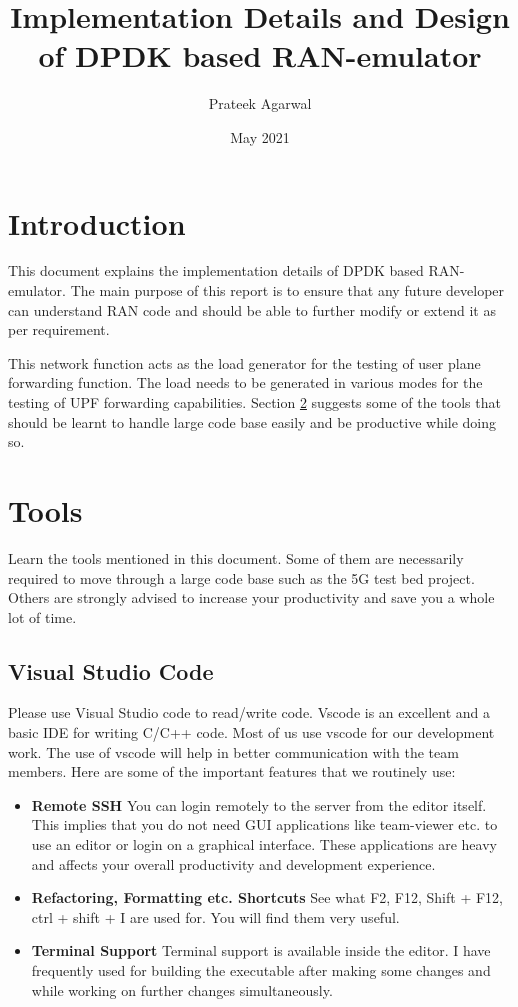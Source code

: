 \documentclass{article}
\title{Implementation Details and Design of DPDK based RAN-emulator}
\author{Prateek Agarwal}
\date{May 2021}
\begin{document}
\maketitle
\tableofcontents

\section{Introduction} \label{Intro}
This document explains the implementation details of DPDK based RAN-emulator. The main purpose of this report is to ensure that any future developer can understand RAN code and should be able to further modify or extend it as per requirement.

This network function acts as the load generator for the testing of user plane forwarding function.
The load needs to be generated in various modes for the testing of UPF forwarding capabilities.
Section \ref{tools} suggests some of the tools that should be learnt to handle large code base easily and be productive while doing so.

\section{Tools} \label{tools}
Learn the tools mentioned in this document.
Some of them are necessarily required to move through a large code base such as the 5G test bed project. Others are strongly advised to increase your productivity and save you a whole lot of time.
\subsection{Visual Studio Code}
Please use Visual Studio code to read/write code. Vscode is an excellent and a  basic IDE for writing C/C++ code. Most of us use vscode for our development work. The use of vscode will help in better communication with the team members. Here are some of the important features that we routinely use:
\begin{itemize}
    \item \textbf{Remote SSH} You can login remotely to the server from the editor itself. This implies that you do not need GUI applications like team-viewer etc. to use an editor or login on a graphical interface. These applications are heavy and affects your overall productivity and development experience.
    \item \textbf{Refactoring, Formatting etc. Shortcuts} See what F2, F12, Shift + F12, ctrl + shift + I are used for. You will find them very useful.
    \item \textbf{Terminal Support} Terminal support is available inside the editor. I have frequently used for building the executable after making some changes and while working on further changes simultaneously.
\end{itemize}
\end{document}
